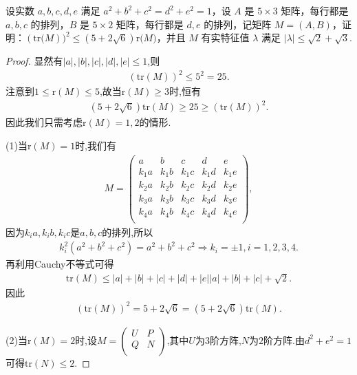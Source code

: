 \documentclass[../../main.tex]{subfiles}%
\begin{document}
\begin{example}
设实数 $a,b,c,d,e$ 满足 $a^2 + b^2 + c^2 = d^2 + e^2 = 1$，设 $A$ 是 $5 \times 3$ 矩阵，每行都是 $a,b,c$ 的排列，$B$ 是 $5 \times 2$ 矩阵，每行都是 $d,e$ 的排列，记矩阵 $M = (A,B)$，证明：$(\mathrm{tr(}M))^2\leqslant \left( 5+2\sqrt{6} \right) \mathrm{r(}M)$，并且 $M$ 有实特征值 $\lambda$ 满足 $|\lambda| \leqslant  \sqrt{2} + \sqrt{3}$.
\end{example}
\begin{proof}
显然有$|a|,|b|,|c|,|d|,|e|\leqslant 1$,则
\begin{align*}
(\mathrm{tr}(M))^2\leqslant 5^2=25.
\end{align*}
注意到$1\leqslant \mathrm{r}(M) \leqslant 5$,故当$\mathrm{r}(M) \geqslant 3$时,恒有
\begin{align*}
\left( 5+2\sqrt{6} \right) \mathrm{tr}(M)\geqslant 25\geqslant (\mathrm{tr}(M))^2.
\end{align*}
因此我们只需考虑$\mathrm{r}(M) =1,2$的情形.

(1)当$\mathrm{r}(M) =1$时,我们有
\begin{align*}
M=\begin{pmatrix}
a&		b&		c&		d&		e\\
k_1a&		k_1b&		k_1c&		k_1d&		k_1e\\
k_2a&		k_2b&		k_2c&		k_2d&		k_2e\\
k_3a&		k_3b&		k_3c&		k_3d&		k_3e\\
k_4a&		k_4b&		k_4c&		k_4d&		k_4e\\
\end{pmatrix},
\end{align*}
因为$k_ia,k_ib,k_ic$是$a,b,c$的排列,所以
\begin{align*}
k_{i}^{2}\left( a^2+b^2+c^2 \right) =a^2+b^2+c^2\Rightarrow k_i=\pm 1,i=1,2,3,4.
\end{align*}
再利用Cauchy不等式可得
\begin{align*}
\mathrm{tr}\left( M \right) \leqslant |a|+|b|+|c|+|d|+|e| |a|+|b|+|c|+\sqrt{2}.
\end{align*}
因此
\begin{align*}
\left( \mathrm{tr}\left( M \right) \right) ^2=5+2\sqrt{6}=\left( 5+2\sqrt{6} \right) \mathrm{tr}(M).
\end{align*}

(2)当$\mathrm{r}(M) =2$时,设$M=\begin{pmatrix}
U&		P\\
Q&		N\\
\end{pmatrix}$,其中$U$为$3$阶方阵,$N$为$2$阶方阵.由$d^2+e^2=1$可得$\mathrm{tr}(N) \leqslant 2$.


\end{proof}
\end{document}
